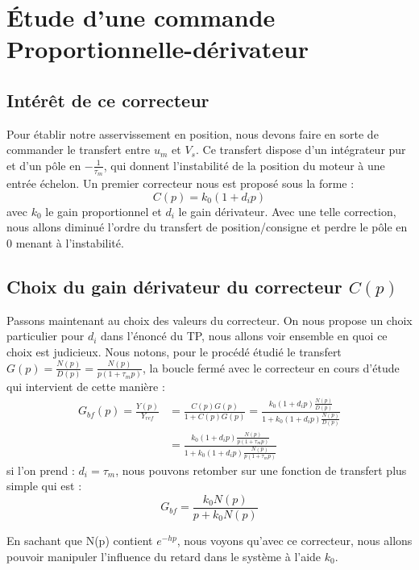 \chapter{Étude d'une commande Proportionnelle-dérivateur}
\section{Intérêt de ce correcteur}
Pour établir notre asservissement en position, nous devons faire en sorte de commander le transfert entre $u_m$ et $V_s$. Ce transfert dispose d'un intégrateur pur et d'un pôle en $-\frac{1}{\tau _m}$, qui donnent l'instabilité de la position du moteur à une entrée échelon. Un premier correcteur nous est proposé sous la forme :
\begin{equation}\label{eqn:correcteurProportionnel}
C(p) = k_0(1+d_ip)
\end{equation} 
avec $k_0$ le gain proportionnel et $d_i$ le gain dérivateur. Avec une telle correction, nous allons diminué l'ordre du transfert de position/consigne et perdre le pôle en 0 menant à l'instabilité. 

\section{Choix du gain dérivateur du correcteur $C(p)$}
Passons maintenant au choix des valeurs du correcteur. On nous propose un choix particulier pour $d_i$ dans l'énoncé du TP, nous allons voir ensemble en quoi ce choix est judicieux. Nous notons, pour le procédé étudié le transfert $G(p) = \frac{N(p)}{D(p)}=\frac{N(p)}{p(1+\tau_mp)}$, la boucle fermé avec le correcteur en cours d'étude qui intervient de cette manière : 
\begin{align*}
G_{bf}(p) = \frac{Y(p)}{Y_{ref}}	&= \frac{C(p)G(p)}{1+C(p)G(p)} 
										= \frac{k_0(1+d_ip) \frac{N(p)}{D(p)}}{1+k_0(1+d_ip) \frac{N(p)}{D(p)}}	\\
									&= \frac{k_0(1+d_ip) \frac{N(p)}{p(1+\tau_mp)}}{1+ k_0(1+d_ip) \frac{N(p)}{p(1+\tau_mp)}}
\end{align*}
si l'on prend : $d_i = \tau_m$, nous pouvons retomber sur une fonction de transfert plus simple qui est :
\begin{equation}\label{eqn:boucleFermeC_PD}
G_{bf} = \frac{k_0 N(p)}{p+k_0N(p)}
\end{equation}

En sachant que N(p) contient $e^{-hp}$, nous voyons qu'avec ce correcteur, nous allons pouvoir manipuler l'influence du retard dans le système à l'aide $k_0$.

